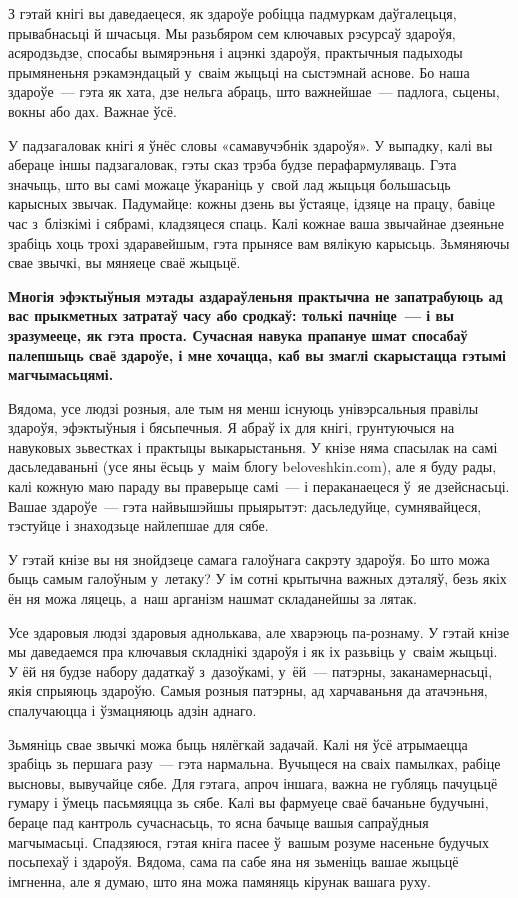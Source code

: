 З гэтай кнігі вы даведаецеся, як здароўе робіцца падмуркам даўгалецьця, прывабнасьці й шчасьця. Мы разьбяром сем ключавых рэсурсаў здароўя, асяродзьдзе, спосабы вымярэньня і ацэнкі здароўя, практычныя падыходы прымяненьня рэкамэндацый у~сваім жыцьці на сыстэмнай аснове. Бо наша здароўе~--- гэта як хата, дзе нельга абраць, што важнейшае~--- падлога, сьцены, вокны або дах. Важнае ўсё.

У падзагаловак кнігі я ўнёс словы «самавучэбнік здароўя». У выпадку, калі вы абераце іншы падзагаловак, гэты сказ трэба будзе перафармуляваць. Гэта значыць, што вы самі можаце ўкараніць у~свой лад жыцьця большасьць карысных звычак. Падумайце: кожны дзень вы ўстаяце, ідзяце на працу, бавіце час з~блізкімі і сябрамі, кладзяцеся спаць. Калі кожнае ваша звычайнае дзеяньне зрабіць хоць трохі здаравейшым, гэта прынясе вам вялікую карысьць. Зьмяняючы свае звычкі, вы мяняеце сваё жыцьцё. 

\textbf{Многія эфэктыўныя мэтады аздараўленьня практычна не запатрабуюць ад вас прыкметных затратаў часу або сродкаў: толькі пачніце~--- і вы зразумееце, як гэта проста. Сучасная навука прапануе шмат спосабаў палепшыць сваё здароўе, і мне хочацца, каб вы змаглі скарыстацца гэтымі магчымасьцямі.}

Вядома, усе людзі розныя, але тым ня менш існуюць унівэрсальныя правілы здароўя, эфэктыўныя і бясьпечныя. Я абраў іх для кнігі, грунтуючыся на навуковых зьвестках і практыцы выкарыстаньня. У кнізе няма спасылак на самі дасьледаваньні (усе яны ёсьць у~маім блогу beloveshkin.com), але я буду рады, калі кожную маю параду вы праверыце самі~--- і пераканаецеся ў~яе дзейснасьці. Вашае здароўе~--- гэта найвышэйшы прыярытэт: дасьледуйце, сумнявайцеся, тэстуйце і знаходзьце найлепшае для сябе.

У гэтай кнізе вы ня знойдзеце самага галоўнага сакрэту здароўя. Бо што можа быць самым галоўным у~летаку? У ім сотні крытычна важных дэталяў, безь якіх ён ня можа ляцець, а~наш арганізм нашмат складанейшы за лятак.

Усе здаровыя людзі здаровыя аднолькава, але хварэюць па-рознаму. У гэтай кнізе мы даведаемся пра ключавыя складнікі здароўя і як іх разьвіць у~сваім жыцьці. У ёй ня будзе набору дадаткаў з~дазоўкамі, у~ёй~--- патэрны, заканамернасьці, якія спрыяюць здароўю. Самыя розныя патэрны, ад харчаваньня да атачэньня, спалучаюцца і ўзмацняюць адзін аднаго.

Зьмяніць свае звычкі можа быць нялёгкай задачай. Калі ня ўсё атрымаецца зрабіць зь першага разу~--- гэта нармальна. Вучыцеся на сваіх памылках, рабіце высновы, вывучайце сябе. Для гэтага, апроч іншага, важна не губляць пачуцьцё гумару і ўмець пасьмяяцца зь сябе. Калі вы фармуеце сваё бачаньне будучыні, бераце пад кантроль сучаснасьць, то ясна бачыце вашыя сапраўдныя магчымасьці. Спадзяюся, гэтая кніга пасее ў~вашым розуме насеньне будучых посьпехаў і здароўя. Вядома, сама па сабе яна ня зьменіць вашае жыцьцё імгненна, але я думаю, што яна можа памяняць кірунак вашага руху. 


